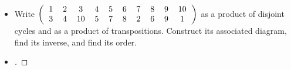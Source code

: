 \documentclass[paper=usletter, fontsize=12pt]{article}
\begin{document}
\begin{itemize}
\begin{itemize}
\begin{itemize}
\begin{proof}[\unskip\nopunct]
\begin{align*}
                            \begin{tabular}{ccccccc}
                                2 & 3 & 6 & 7 & 4 & 1 & 5 \\
                                3 & 7 & 1 & 4 & 6 & 2 & 5
                            \end{tabular}
                        \right)\left(
                            \begin{tabular}{ccccccc}
                                1 & 2 & 3 & 4 & 5 & 6 & 7 \\
                                3 & 2 & 5 & 4 & 6 & 1 & 7
                            \end{tabular}
                        \right) \\
                        & = \left(
                            \begin{tabular}{ccccccc}
                                2 & 3 & 6 & 7 & 4 & 1 & 5 \\
                                5 & 7 & 3 & 4 & 1 & 2 & 6
                            \end{tabular}
                        \right) \qedhere
                    \end{align*}
                    \endgroup
                \end{proof}
                \vspace{0.2in}

            \end{itemize}

            \item[\textbf{3}] Write $\left(
                \begin{tabular}{cccccccccc}
                    1 & 2 & 3 & 4 & 5 & 6 & 7 & 8 & 9 & 10 \\
                    3 & 4 & 10 & 5 & 7 & 8 & 2 & 6 & 9 & 1
                \end{tabular}
            \right)$ as a product of disjoint cycles and as a product of
            transpositions. Construct its associated diagram, find its inverse,
            and find its order.
            \item[\textbf{Ans}]
            \begin{proof}[\unskip\nopunct]


\end{proof}
\end{itemize}
\end{itemize}
\end{document}

